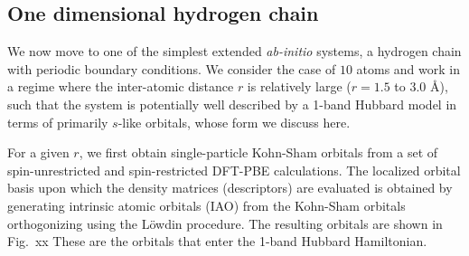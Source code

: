 \subsection{One dimensional hydrogen chain}
We now move to one of the simplest extended \emph{ab-initio} systems, a hydrogen chain with periodic boundary conditions. 
We consider the case of $10$ atoms and work in a regime where the inter-atomic distance $r$ is 
relatively large ($r=1.5$ to $3.0$ \AA), such that the system is potentially well described by a 1-band Hubbard model 
in terms of primarily $s$-like orbitals, whose form we discuss here. 


For a given $r$, we first obtain single-particle Kohn-Sham orbitals from a set of spin-unrestricted and 
spin-restricted DFT-PBE calculations. The localized orbital basis upon which the density matrices (descriptors) are evaluated is obtained by generating intrinsic atomic orbitals (IAO) from the Kohn-Sham orbitals  orthogonizing using 
the L\"owdin procedure. The resulting orbitals are shown in Fig.~xx 
These are the orbitals that enter the 1-band Hubbard Hamiltonian. 

